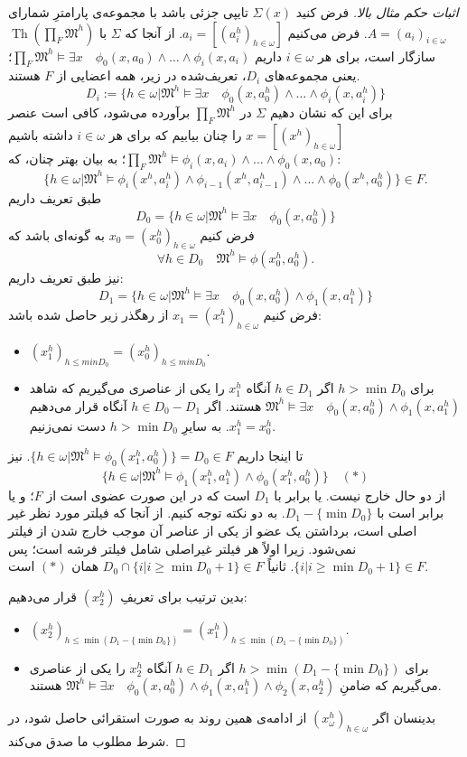 \documentclass[12pt,a4paper]{report}
\theoremstyle{colorhead}
\DeclareMathOperator{\Th}{Th}
\begin{document}
 \begin{proof}[اثبات حکم مثال بالا]
 فرض کنید
 $\Sigma(x)$
 تایپی جزئی باشد با مجموعه‌ی پارامترِ شمارای
\mbox{$A=(a_i)_{i\in \omega}$}.
 فرض می‌کنیم
 $a_i=[(a_i^h)_{h\in \omega}]$.
 از آنجا که 
 $\Sigma$
 با
 $\Th(\prod_F \mathfrak{M}^h)$
 سازگار است، برای هر
 $i\in \omega$
 داریم
 $\prod_F \mathfrak{M}^h\models \exists x \quad \phi_0(x,a_0)\wedge \ldots\wedge \phi_i(x,a_i)$؛ 
 یعنی
مجموعه‌های
$D_i$،
تعریف‌شده در زیر، همه‌ اعضایی از
$F$
هستند.
 \[
 D_i:=\{h\in \omega| \mathfrak{M}^h\models \exists x\quad  \phi_0(x,a_0^h)\wedge \ldots \wedge \phi_i(x,a_i^h)\}
 \]
 برای این که نشان دهیم
 $\Sigma$
 در 
 $\prod_F \mathfrak{M}^h$
 برآورده می‌شود، کافی است عنصر
 $x=[(x^h)_{h\in \omega}]$
 را چنان بیابیم که برای هر
 $i\in \omega$
داشته باشیم
$\prod_F \mathfrak{M}^h\models \phi_i(x,a_i)\wedge \ldots\wedge\phi_0(x,a_0)$؛
به بیان بهتر چنان، که:
\[\{h\in \omega|\mathfrak{M}^h\models \phi_i(x^h,a_i^h)\wedge \phi_{i-1}(x^h,a_{i-1}^h)\wedge\ldots \wedge\phi_0(x^h,a_0^h)\}\in F.\]
طبق تعریف داریم
\[
D_0=
 \{h\in \omega| \mathfrak{M}^h\models \exists x\quad  \phi_0(x,a_0^h)\}
\] 
فرض کنیم
$x_0=(x_0^h)_{h\in \omega}$
 به گونه‌ای باشد که 
\[\forall h\in D_0\quad \mathfrak{M}^h\models \phi(x_0^h,a_0^h).\]
نیز طبق تعریف داریم:
\[
D_1=
 \{h\in \omega| \mathfrak{M}^h\models \exists x\quad  \phi_0(x,a_0^h)\wedge \phi_1(x,a_1^h)\}
 \]
  فرض کنیم
  $x_1=(x_1^h)_{h\in \omega}$
  از رهگذر زیر حاصل شده باشد:
  \begin{itemize}
  \item 
  $(x_1^h)_{h\leq min D_0}=(x_0^h)_{h\leq min D_0}$.
  \item 
  برای 
  $h>\min D_0$
  اگر
  $h\in D_1$
  آنگاه
  $x_1^h$
  را یکی از عناصری می‌گیریم که شاهد
 \mbox{$\mathfrak{M}^h\models \exists x\quad \phi_0(x,a_0^h)\wedge \phi_1(x,a_1^h)$}
  هستند. اگر
  $h\in D_0-D_1$
  آنگاه
  قرار می‌دهیم
  $x_1^h=x_0^h$.
  به سایرِ
  $h>\min D_0$
  دست نمی‌زنیم.
  \end{itemize}
تا اینجا داریم
$\{h\in \omega |\mathfrak{M}^h\models \phi_0(x_1^h,a_0^h)\}=D_0\in F$.
نیز 
\[\{h\in \omega |\mathfrak{M}^h\models \phi_1(x_1^h,a_1^h)\wedge \phi_0(x_1^h,a_0^h)\}\quad (*)\]
از دو حال خارج نیست. یا برابر با
$D_1$
است که در این صورت عضوی است از
$F$؛
و یا برابر است با
$D_1-\{\min D_0\}$.
به دو نکته توجه کنیم. از آنجا که فیلتر مورد نظر غیر اصلی است، برداشتن یک عضو از یکی از 
عناصر آن موجب خارج شدن از فیلتر نمی‌شود. زیرا
اولاً هر فیلتر غیراصلی شامل فیلتر فرشه است؛ پس
$\{i|i\geq \min D_0+1\}\in F$.
ثانیاً
$D_0\cap \{i|i\geq \min D_0+1\}\in F$
همان 
$(*)$
است.
\par 
بدین ترتیب برای تعریفِ
$(x_2^h)$
قرار می‌دهیم:
 \begin{itemize}
  \item 
  $(x_2^h)_{h\leq \min(D_1-\{\min D_0\})}=(x_1^h)_{h\leq \min (D_1-\{\min D_0\})}$.
  \item 
  برای 
  $h> \min(D_1-\{\min D_0\})$
  اگر
  $h\in D_1$
  آنگاه
  $x_2^h$
  را یکی از عناصری می‌گیریم که ضامنِ
  $\mathfrak{M}^h\models \exists x\quad \phi_0(x,a_0^h)\wedge \phi_1(x,a_1^h)\wedge\phi_2(x,a_2^h)$
  هستند. 
  \end{itemize}
  بدینسان اگر
  $(x_\omega^h)_{h\in \omega}$
  از ادامه‌ی همین روند به صورت استقرائی حاصل شود، در شرط مطلوب ما صدق می‌کند. 
  \end{proof}
\end{document}

